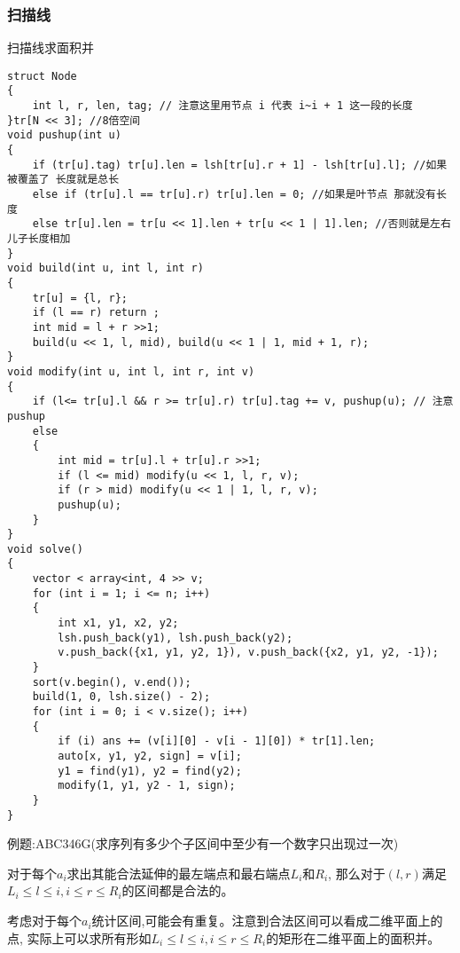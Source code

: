 \documentclass[a4paper, fontset=none]{ctexart}
\begin{document}
\subsubsection{扫描线}
扫描线求面积并
\begin{verbatim}
struct Node
{
    int l, r, len, tag; // 注意这里用节点 i 代表 i~i + 1 这一段的长度
}tr[N << 3]; //8倍空间
void pushup(int u)
{
    if (tr[u].tag) tr[u].len = lsh[tr[u].r + 1] - lsh[tr[u].l]; //如果被覆盖了 长度就是总长
    else if (tr[u].l == tr[u].r) tr[u].len = 0; //如果是叶节点 那就没有长度
    else tr[u].len = tr[u << 1].len + tr[u << 1 | 1].len; //否则就是左右儿子长度相加
}
void build(int u, int l, int r)
{
    tr[u] = {l, r};
    if (l == r) return ;
    int mid = l + r >>1;
    build(u << 1, l, mid), build(u << 1 | 1, mid + 1, r);
}
void modify(int u, int l, int r, int v)
{
    if (l<= tr[u].l && r >= tr[u].r) tr[u].tag += v, pushup(u); // 注意 pushup
    else
    {
        int mid = tr[u].l + tr[u].r >>1;
        if (l <= mid) modify(u << 1, l, r, v);
        if (r > mid) modify(u << 1 | 1, l, r, v);
        pushup(u);
    }
}
void solve()
{
    vector < array<int, 4 >> v;
    for (int i = 1; i <= n; i++)
    {
        int x1, y1, x2, y2;
        lsh.push_back(y1), lsh.push_back(y2);
        v.push_back({x1, y1, y2, 1}), v.push_back({x2, y1, y2, -1});
    }
    sort(v.begin(), v.end());
    build(1, 0, lsh.size() - 2);
    for (int i = 0; i < v.size(); i++)
    {
        if (i) ans += (v[i][0] - v[i - 1][0]) * tr[1].len;
        auto[x, y1, y2, sign] = v[i];
        y1 = find(y1), y2 = find(y2);
        modify(1, y1, y2 - 1, sign);
    }
}
\end{verbatim}

例题:ABC346G(求序列有多少个子区间中至少有一个数字只出现过一次)

对于每个$a_i$求出其能合法延伸的最左端点和最右端点$L_i$和$R_i$,
那么对于$(l, r)$满足$L_i\leqslant l\leqslant i, i\leqslant r\leqslant R_i$的区间都是合法的。

考虑对于每个$a_i$统计区间,可能会有重复。注意到合法区间可以看成二维平面上的点,
实际上可以求所有形如$L_i\leqslant l\leqslant i, i\leqslant r\leqslant R_i$的矩形在二维平面上的面积并。
\end{document}

